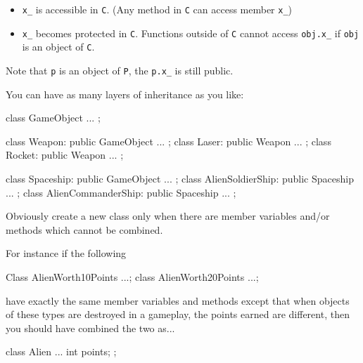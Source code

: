 \begin{itemize}
\item
  \verb!x_! is accessible in \verb!C!. (Any method in \verb!C! can
  access member \verb!x_!)
\item
  \verb!x_! becomes protected in \verb!C!. Functions outside of
  \verb!C! cannot access \verb!obj.x_! if \verb!obj! is an object of
  \verb!C!.
\end{itemize}

Note that \verb!p! is an object of \verb!P!, the \verb!p.x_! is still public.

You can have as many layers of inheritance as you like:
\begin{console}
class GameObject { ... };

class Weapon: public GameObject { ... };
class Laser: public Weapon { ... };
class Rocket: public Weapon { ... };

class Spaceship: public GameObject { ... };
class AlienSoldierShip: public Spaceship { ... };
class AlienCommanderShip: public Spaceship { ... };
\end{console}

Obviously create a new class only when there are member variables and/or
methods which cannot be combined.

For instance if the following
\begin{console}
Class AlienWorth10Points {...};
class AlienWorth20Points {...};
\end{console}

have exactly the same member variables and methods except that when
objects of these types are destroyed in a gameplay, the points earned
are different, then you should have combined the two as...
\begin{console}
class Alien
{
...
    int points;
}; 
\end{console}

\newpage{}

